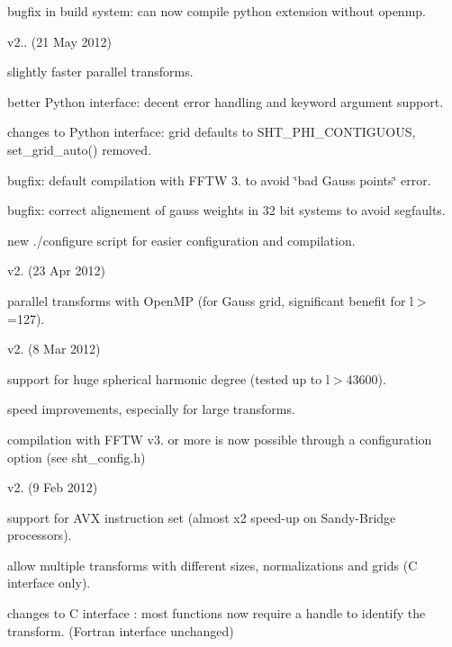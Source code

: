 \begin{DoxyItemize}
\begin{DoxyItemize}
\item bugfix in build system\+: can now compile python extension without openmp.
\end{DoxyItemize}
\item v2.. (21 May 2012)
\begin{DoxyItemize}
\item slightly faster parallel transforms.
\item better Python interface\+: decent error handling and keyword argument support.
\item changes to Python interface\+: grid defaults to {\ttfamily S\+H\+T\+\_\+\+P\+H\+I\+\_\+\+C\+O\+N\+T\+I\+G\+U\+O\+U\+S}, {\ttfamily set\+\_\+grid\+\_\+auto()} removed.
\item bugfix\+: default compilation with F\+F\+T\+W 3. to avoid \char`\"{}bad Gauss points\char`\"{} error.
\item bugfix\+: correct alignement of gauss weights in 32 bit systems to avoid segfaults.
\item new ./configure script for easier configuration and compilation.
\end{DoxyItemize}
\item v2. (23 Apr 2012)
\begin{DoxyItemize}
\item parallel transforms with Open\+M\+P (for Gauss grid, significant benefit for l$>$=127).
\end{DoxyItemize}
\item v2. (8 Mar 2012)
\begin{DoxyItemize}
\item support for huge spherical harmonic degree (tested up to l$>$43600).
\item speed improvements, especially for large transforms.
\item compilation with F\+F\+T\+W v3. or more is now possible through a configuration option (see {\ttfamily sht\+\_\+config.\+h})
\end{DoxyItemize}
\item v2. (9 Feb 2012)
\begin{DoxyItemize}
\item support for A\+V\+X instruction set (almost x2 speed-\/up on Sandy-\/\+Bridge processors).
\item allow multiple transforms with different sizes, normalizations and grids (C interface only).
\item changes to C interface \+: most functions now require a handle to identify the transform. (Fortran interface unchanged)

\end{DoxyItemize}
\end{DoxyItemize}
